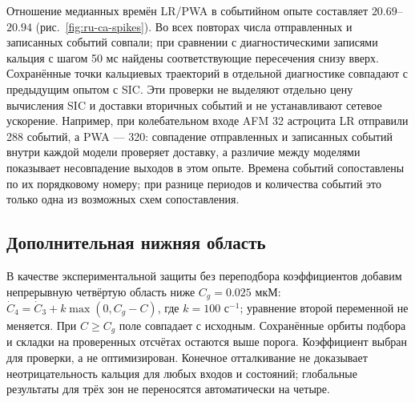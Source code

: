Отношение медианных времён LR/PWA в событийном опыте составляет $20.69$--$20.94$ (рис.~\ref{fig:ru-ca-spikes}). Во всех повторах числа отправленных и записанных событий совпали; при сравнении с диагностическими записями кальция с шагом 50 мс найдены соответствующие пересечения снизу вверх. Сохранённые точки кальциевых траекторий в отдельной диагностике совпадают с предыдущим опытом с SIC. Эти проверки не выделяют отдельно цену вычисления SIC и доставки вторичных событий и не устанавливают сетевое ускорение. Например, при колебательном входе AFM 32 астроцита LR отправили 288 событий, а PWA --- 320: совпадение отправленных и записанных событий внутри каждой модели проверяет доставку, а различие между моделями показывает несовпадение выходов в этом опыте. Времена событий сопоставлены по их порядковому номеру; при разнице периодов и количества событий это только одна из возможных схем сопоставления.

\subsection{Дополнительная нижняя область}
В качестве экспериментальной защиты без переподбора коэффициентов добавим непрерывную четвёртую область ниже $C_g=0.025$ мкМ: $\dot C_4=\dot C_3+k\max(0,C_g-C)$, где $k=100$ с$^{-1}$; уравнение второй переменной не меняется. При $C\geq C_g$ поле совпадает с исходным. Сохранённые орбиты подбора и складки на проверенных отсчётах остаются выше порога. Коэффициент выбран для проверки, а не оптимизирован. Конечное отталкивание не доказывает неотрицательность кальция для любых входов и состояний; глобальные результаты для трёх зон не переносятся автоматически на четыре.

